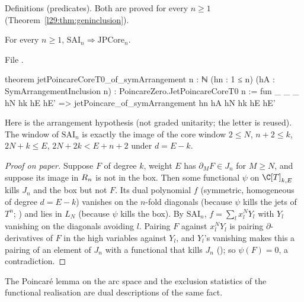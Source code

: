 \begin{status}
Definitions (predicates). Both are proved for every $n\ge1$ (Theorem~\ref{l29:thm:geninclusion}).
\end{status}

\begin{theorem}\label{l29:thm:poincarecore}
For every $n\ge1$, $\mathrm{SAI}_n\Rightarrow\mathrm{JPCore}_n$.
\end{theorem}

\noindent File .
\begin{leancode}
theorem jetPoincareCoreT0_of_symArrangement {n : ℕ} (hn : 1 ≤ n)
    (hA : SymArrangementInclusion n) : PoincareZero.JetPoincareCoreT0 n :=
  fun _ _ _ hN hk hE hE' => jetPoincare_of_symArrangement hn hA hN hk hE hE'
\end{leancode}

\begin{dictionary}
Here  is the arrangement hypothesis (not graded unitarity; the letter is reused). The window of
$\mathrm{SAI}_n$ is exactly the image of the core window $2\le N$, $n+2\le k$, $2N+k\le E$, $2N+2k<E+n+2$ under $d=E-k$.
\end{dictionary}

\begin{proof}[Proof on paper]
Suppose $F$ of degree $k$, weight $E$ has $\partial_MF\in J_n$ for $M\ge N$, and suppose its image in $R_n$ is
not in the box. Then some functional $\psi$ on $\C[T]_{k,E}$ kills $J_n$ and the box but not $F$. Its dual polynomial
$f$ (symmetric, homogeneous of degree $d=E-k$) vanishes on the $n$-fold diagonals (because $\psi$ kills the jets of
$T^n$; ) and lies in $L_N$ (because $\psi$ kills the box). By $\mathrm{SAI}_n$, $f=\sum_lx_l^NY_l$
with $Y_l$ vanishing on the diagonals avoiding $l$. Pairing $F$ against $x_l^NY_l$ is pairing $\partial$-derivatives of
$F$ in the high variables against $Y_l$, and $Y_l$'s vanishing makes this a pairing of an element of $J_n$ with a
functional that kills $J_n$ (); so $\psi(F)=0$, a contradiction.
\end{proof}

\begin{physics}
The Poincar\'e lemma on the arc space and the exclusion statistics of the functional realisation are dual descriptions of
the same fact.
\end{physics}

